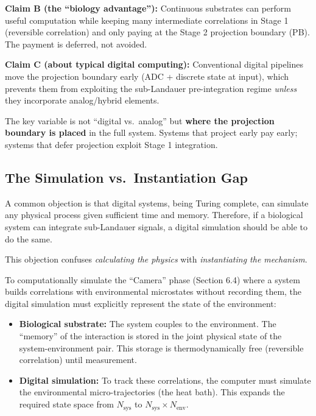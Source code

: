 \documentclass[12pt]{article}
\numberwithin{equation}{section}
\begin{document}
\textbf{Claim B (the ``biology advantage''):} Continuous substrates can perform useful computation while keeping many intermediate correlations in Stage 1 (reversible correlation) and only paying at the Stage 2 projection boundary (PB). The payment is deferred, not avoided.

\textbf{Claim C (about typical digital computing):} Conventional digital pipelines move the projection boundary early (ADC + discrete state at input), which prevents them from exploiting the sub-Landauer pre-integration regime \emph{unless} they incorporate analog/hybrid elements.

The key variable is not ``digital vs.\ analog'' but \textbf{where the projection boundary is placed} in the full system. Systems that project early pay early; systems that defer projection exploit Stage 1 integration.

\subsection{The Simulation vs.\ Instantiation Gap}

A common objection is that digital systems, being Turing complete, can simulate any physical process given sufficient time and memory. Therefore, if a biological system can integrate sub-Landauer signals, a digital simulation should be able to do the same.

This objection confuses \emph{calculating the physics} with \emph{instantiating the mechanism}.

To computationally simulate the ``Camera'' phase (Section 6.4) where a system builds correlations with environmental microstates without recording them, the digital simulation must explicitly represent the state of the environment:

\begin{itemize}
\item \textbf{Biological substrate:} The system couples to the environment. The ``memory'' of the interaction is stored in the joint physical state of the system-environment pair. This storage is thermodynamically free (reversible correlation) until measurement.

\item \textbf{Digital simulation:} To track these correlations, the computer must simulate the environmental micro-trajectories (the heat bath). This expands the required state space from $N_{\text{sys}}$ to $N_{\text{sys}} \times N_{\text{env}}$.
\end{itemize}
\end{document}
